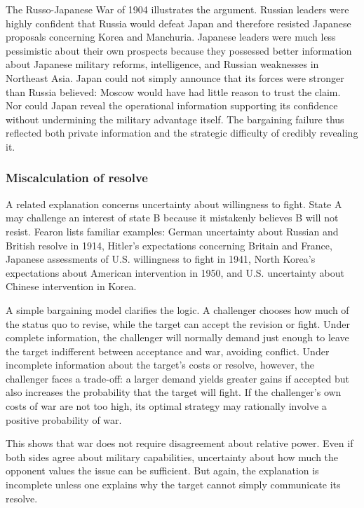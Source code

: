 The Russo-Japanese War of 1904 illustrates the argument. Russian leaders were highly confident that Russia would defeat Japan and therefore resisted Japanese proposals concerning Korea and Manchuria. Japanese leaders were much less pessimistic about their own prospects because they possessed better information about Japanese military reforms, intelligence, and Russian weaknesses in Northeast Asia. Japan could not simply announce that its forces were stronger than Russia believed: Moscow would have had little reason to trust the claim. Nor could Japan reveal the operational information supporting its confidence without undermining the military advantage itself. The bargaining failure thus reflected both private information and the strategic difficulty of credibly revealing it.

\subsubsection{Miscalculation of resolve}

A related explanation concerns uncertainty about willingness to fight. State A may challenge an interest of state B because it mistakenly believes B will not resist. Fearon lists familiar examples: German uncertainty about Russian and British resolve in 1914, Hitler's expectations concerning Britain and France, Japanese assessments of U.S. willingness to fight in 1941, North Korea's expectations about American intervention in 1950, and U.S. uncertainty about Chinese intervention in Korea.

A simple bargaining model clarifies the logic. A challenger chooses how much of the status quo to revise, while the target can accept the revision or fight. Under complete information, the challenger will normally demand just enough to leave the target indifferent between acceptance and war, avoiding conflict. Under incomplete information about the target's costs or resolve, however, the challenger faces a trade-off: a larger demand yields greater gains if accepted but also increases the probability that the target will fight. If the challenger's own costs of war are not too high, its optimal strategy may rationally involve a positive probability of war.

This shows that war does not require disagreement about relative power. Even if both sides agree about military capabilities, uncertainty about how much the opponent values the issue can be sufficient. But again, the explanation is incomplete unless one explains why the target cannot simply communicate its resolve.

